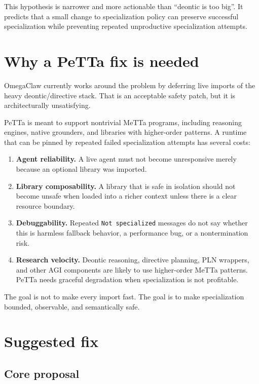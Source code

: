\documentclass[11pt]{article}
\begin{document}
This hypothesis is narrower and more actionable than ``deontic is too big''. It predicts that a small change to specialization policy can preserve successful specialization while preventing repeated unproductive specialization attempts.

\section{Why a PeTTa fix is needed}

OmegaClaw currently works around the problem by deferring live imports of the heavy deontic/directive stack. That is an acceptable safety patch, but it is architecturally unsatisfying.

PeTTa is meant to support nontrivial MeTTa programs, including reasoning engines, native grounders, and libraries with higher-order patterns. A runtime that can be pinned by repeated failed specialization attempts has several costs:

\begin{enumerate}[nosep]
\item \textbf{Agent reliability.} A live agent must not become unresponsive merely because an optional library was imported.
\item \textbf{Library composability.} A library that is safe in isolation should not become unsafe when loaded into a richer context unless there is a clear resource boundary.
\item \textbf{Debuggability.} Repeated \texttt{Not specialized} messages do not say whether this is harmless fallback behavior, a performance bug, or a nontermination risk.
\item \textbf{Research velocity.} Deontic reasoning, directive planning, PLN wrappers, and other AGI components are likely to use higher-order MeTTa patterns. PeTTa needs graceful degradation when specialization is not profitable.
\end{enumerate}

The goal is not to make every import fast. The goal is to make specialization bounded, observable, and semantically safe.

\section{Suggested fix}

\subsection{Core proposal}
\end{document}

